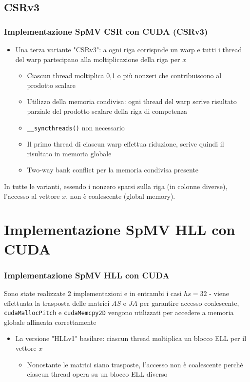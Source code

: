 \documentclass{beamer}
\begin{document}
\subsection{CSRv3}
\begin{frame}
    \frametitle{Implementazione SpMV CSR con CUDA (CSRv3)}

    \begin{itemize}
    	\item Una terza variante "CSRv3": a ogni riga corrispnde un warp e tutti i thread
    	del warp partecipano alla moltiplicazione della riga per $x$
    	\begin{itemize}
    		\item Ciascun thread moltiplica 0,1 o più nonzeri che contribuiscono al prodotto
    		scalare
    		\item Utilizzo della memoria condivisa: ogni thread del warp scrive risultato
    		parziale del prodotto scalare della riga di competenza
    		\item \texttt{\_\_syncthreads()} non necessario
    		\item Il primo thread di ciascun warp effettua riduzione, scrive quindi il
    		risultato in memoria globale
    		\item Two-way bank conflict per la memoria condivisa presente
    	\end{itemize}
    	
    \end{itemize}
    
    In tutte le varianti, essendo i nonzero sparsi sulla riga (in colonne diverse),
    l'accesso al vettore $x$,
    non è coalescente (global memory).
\end{frame}

\section{Implementazione SpMV HLL con CUDA}
\begin{frame}
    \frametitle{Implementazione SpMV HLL con CUDA}
    
    Sono state realizzate 2 implementazioni e in entrambi i casi $hs = 32$ - viene effettuata la
    trasposta delle matrici $AS$ e $JA$ per garantire accesso coalescente, 
    \texttt{cudaMallocPitch} e \texttt{cudaMemcpy2D} vengono utilizzati per accedere a memoria 
    globale allineata correttamente
    
    \begin{itemize}
    	\item La versione "HLLv1" basilare: ciascun thread moltiplica un blocco ELL per il vettore
    	$x$
    	
    	\begin{itemize}
    		\item Nonostante le matrici siano trasposte, l'accesso non è coalescente perchè
    		ciascun thread opera su un blocco ELL diverso
    	\end{itemize}

    \end{itemize}
    
\end{frame}
\end{document}
